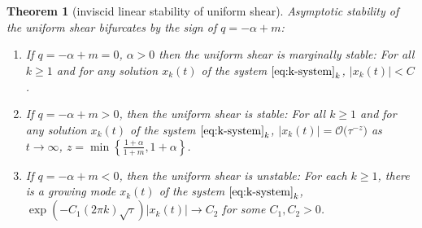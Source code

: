 \documentclass[a4paper,11pt]{article}
\def\k{(2\pi k)}
\newtheorem{theorem}{Theorem}
\theoremstyle{remark}
\begin{document}
\begin{theorem}[inviscid linear stability of uniform shear] Asymptotic stability of the uniform shear bifurcates by the sign of $q=-\alpha+m$:
 \begin{enumerate}
  \item If $q=-\alpha+m=0$, $\alpha>0$ then the uniform shear is marginally stable: For all $k\ge 1$ and for any solution $x_k(t)$ of the system $\eqref{eq:k-system}_k$, $|x_k(t)| < C$.
  \item If $q=-\alpha+m>0$, then the uniform shear is stable: For all $k\ge 1$ and for any solution $x_k(t)$ of the system $\eqref{eq:k-system}_k$, $|x_k(t)| = \mathcal{O}\big(\tau^{-z}\big)$ as $t \rightarrow \infty$, $z = \min \left\{\frac{1+\alpha}{1+m}, 1+\alpha\right\}$.
  \item If $q=-\alpha+m<0$, then the uniform shear is unstable: For each $k\ge 1$, there is a growing mode $x_k(t)$ of the system $\eqref{eq:k-system}_k$, $\exp\left(-C_1\k\sqrt{\tau}\right)|x_k(t)| \rightarrow C_2$ for some $C_1,C_2> 0$.
 \end{enumerate}
\end{theorem}
\end{document}

